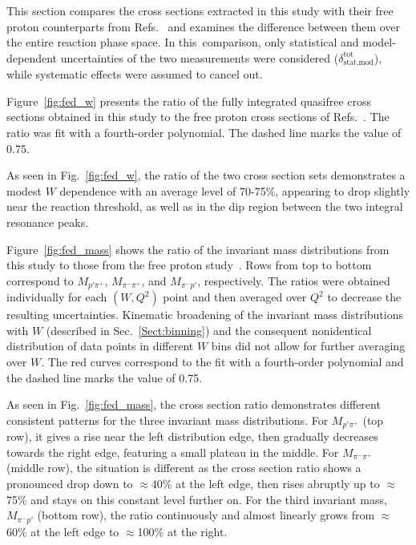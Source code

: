 \documentclass[prc,twocolumn,superscriptaddress,showpacs,amssymb,amsmath,amsfonts,aps,nofootinbib]{revtex4-1}
\begin{document}
This section compares the cross sections extracted in this study with their free proton counterparts from Refs.\!~\cite{Fed_an_note:2017,Fed_paper_2018} and examines the difference between them over the entire reaction phase space. In this~comparison, only statistical and model-dependent uncertainties of the two measurements were considered ($\delta_{\text{stat,mod}}^{\text{tot}}$), while systematic effects were assumed to cancel out.

Figure~\ref{fig:fed_w} presents the ratio of the fully integrated quasifree cross sections obtained in this study to the free proton cross sections of Refs.\!~\cite{Fed_an_note:2017,Fed_paper_2018}. The ratio was fit with a fourth-order polynomial. The dashed line marks the value of 0.75.  

As seen in Fig.\!~\ref{fig:fed_w}, the ratio of the two cross section sets demonstrates a modest $W$ dependence with an average level of 70-75\%, appearing to drop slightly near the reaction threshold, as well as in the dip region between the two integral resonance peaks.


Figure~\ref{fig:fed_mass} shows the ratio of the invariant mass distributions from this study to those from the free proton study~\cite{Fed_an_note:2017,Fed_paper_2018}. Rows from top to bottom correspond to $M_{p'\pi^{+}}$, $M_{\pi^{-}\pi^{+}}$, and $M_{\pi^{-}p'}$, respectively. The ratios were obtained individually for each $(W,Q^{2})$ point and then averaged over $Q^{2}$ to decrease the resulting uncertainties. Kinematic broadening of the invariant mass distributions with $W$ (described in Sec.\!~\ref{Sect:binning}) and the consequent nonidentical distribution of data points in different $W$ bins did not allow for further averaging over $W$. The red curves correspond to the fit with a fourth-order polynomial and the dashed line marks the value of 0.75.  

As seen in Fig.\!~\ref{fig:fed_mass}, the cross section ratio demonstrates different consistent patterns for the three invariant mass distributions. For $M_{p'\pi^{+}}$ (top row), it gives a rise near the left distribution edge, then gradually decreases towards the right edge, featuring a small plateau in the middle. For $M_{\pi^{-}\pi^{+}}$ (middle row), the situation is different as the cross section ratio shows a pronounced drop down to $\approx$40\% at the left edge, then rises abruptly up to $\approx$75\% and stays on this constant level further on. For the third invariant mass, $M_{\pi^{-}p'}$ (bottom row), the ratio continuously and almost linearly grows from $\approx$60\% at the left edge to $\approx$100\% at the right. 
\end{document}
